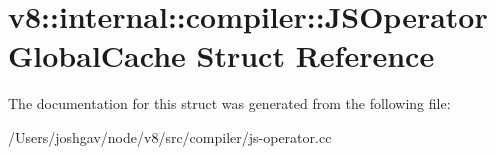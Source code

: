 \hypertarget{structv8_1_1internal_1_1compiler_1_1_j_s_operator_global_cache}{}\section{v8\+:\+:internal\+:\+:compiler\+:\+:J\+S\+Operator\+Global\+Cache Struct Reference}
\label{structv8_1_1internal_1_1compiler_1_1_j_s_operator_global_cache}


The documentation for this struct was generated from the following file\+:\begin{DoxyCompactItemize}
\item 
/\+Users/joshgav/node/v8/src/compiler/js-\/operator.\+cc\end{DoxyCompactItemize}
